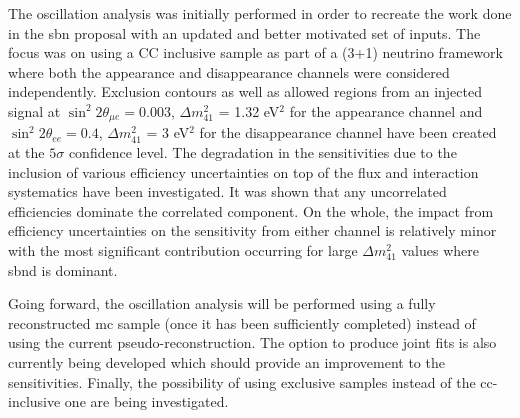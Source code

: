 The oscillation analysis was initially performed in order to recreate the work done in the \gls{sbn} proposal with an updated and better motivated set of inputs. The focus was on using a \nue CC inclusive sample as part of a (3+1) neutrino framework where both the \nue appearance and disappearance channels were considered independently. Exclusion contours as well as allowed regions from an injected signal at $\sin^2{2\theta_{\mu e}} = 0.003$, $\Delta m^2_{41}$ = 1.32 eV$^2$ for the appearance channel and $\sin^2{2\theta_{ee}} = 0.4$, $\Delta m^2_{41}$ = 3 eV$^2$ for the disappearance channel have been created at the $5\sigma$ confidence level. The degradation in the sensitivities due to the inclusion of various efficiency uncertainties on top of the flux and interaction systematics have been investigated. It was shown that any uncorrelated efficiencies dominate the correlated component. On the whole, the impact from efficiency uncertainties on the sensitivity from either \nue channel is relatively minor with the most significant contribution occurring for large $\Delta m^2_{41}$ values where \gls{sbnd} is dominant. 

Going forward, the oscillation analysis will be performed using a fully reconstructed \gls{mc} sample (once it has been sufficiently completed) instead of using the current pseudo-reconstruction. The option to produce joint fits is also currently being developed which should provide an improvement to the sensitivities. Finally, the possibility of using exclusive samples instead of the \gls{cc}-inclusive one are being investigated.

















